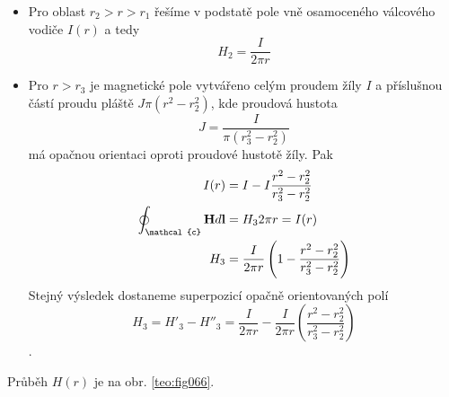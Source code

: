 \begin{mdframed}[style=mdexam]
\begin{example}
\begin{itemize}
      \item Pro oblast $r_2>r>r_1$ řešíme v podstatě pole vně osamoceného válcového vodiče $I(r)$ a
            tedy $$H_2 = \frac{I}{2\pi r}$$
      \item Pro $r>r_3$ je magnetické pole vytvářeno celým proudem žíly $I$ a příslušnou částí
            proudu pláště $J\pi(r^2 - r_2^2)$, kde proudová hustota $$J =
            \frac{I}{\pi(r_3^2-r_2^2)}$$ má opačnou orientaci oproti proudové hustotě žíly. Pak 
            \begin{align*}
              I(r)                             &= I - I\frac{r^2-r_2^2}{r_3^2-r_2^2} \\
              \oint_{\mathcal{c}}\vr{H}d\vr{l} &= H_32\pi r = I(r)                   \\          
              H_3                              &= \frac{I}{2\pi r}\left(1 - 
              \frac{r^2 - r_2^2}{r_3^2 - r_2^2}\right) 
            \end{align*}
            Stejný výsledek dostaneme superpozicí opačně orientovaných polí
            $$H_3 = H'_3 - H''_3 = \frac{I}{2\pi r} - \frac{I}{2\pi r}\left(\frac{r^2 - r_2^2}{r_3^2
            - r_2^2}\right)$$. 
    \end{itemize}
    Průběh $H(r)$ je na obr. \ref{teo:fig066}.
  \end{example}
\end{mdframed}